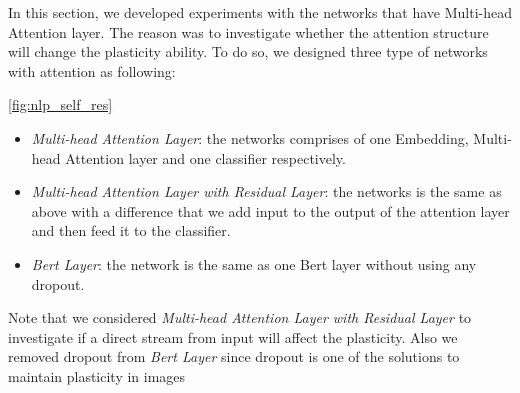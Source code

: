 In this section, we developed experiments with the networks that have Multi-head Attention layer. The reason was to investigate whether the attention structure will change the plasticity ability. To do so, we designed three type of networks with attention as following:

\autoref{fig:nlp_self_res}

\begin{itemize}
    \item \textit{Multi-head Attention Layer}: the networks comprises of one Embedding, Multi-head Attention layer and one classifier respectively.
    \item \textit{Multi-head Attention Layer with Residual Layer}: the networks is the same as above with a difference that we add input to the output of the attention layer and then feed it to the classifier. 
    \item \textit{Bert Layer}: the network is the same as one Bert layer without using any dropout.  
\end{itemize}

Note that we considered \textit{Multi-head Attention Layer with Residual Layer} to investigate if a direct stream from input will affect the plasticity. 
Also we removed dropout from \textit{Bert Layer} since dropout is one of the solutions to maintain plasticity in images~\cite{} 





